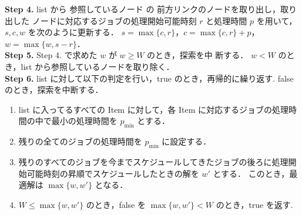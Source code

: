 \documentclass[12pt]{optlab-bachelor}
\begin{document}
  \textbf{Step 4.} list から 参照しているノード の 前方リンクのノードを取り出し，取り出した
  ノードに対応するジョブの処理開始可能時刻 $r$ と処理時間 $p$ を用いて，
  $s,c,w$ を次のように更新する．
  $s = \max\{c, r\}$，$c = \max\{c, r\} + p$，$w = \max\{w, s - r\}$．\\

  \textbf{Step 5.} Step 4. で求めた $w$ が $w \ge W$ のとき，探索を中
  断する．
  $w < W$ のとき，list から参照しているノードを取り除く．\\

  \textbf{Step 6.} list に対して以下の判定を行い，true のとき，再帰的に繰り返す. false のとき，探索を中断する．
  \begin{enumerate}
    \item list に入ってるすべての Item に対して，各 Item に対応するジョブの処理時間の中で最小の処理時間を $p_{\min}$ とする．
    \item 残りの全てのジョブの処理時間を $p_{\min}$ に設定する．
    \item 残りのすべてのジョブを今までスケジュールしてきたジョブの後ろに処理開始可能時刻の昇順でスケジュールしたときの解を $w'$ とする．
    このとき，最適解は $\max\{w, w'\}$ となる．
    \item $W \le \max\{w, w'\}$ のとき，false を $\max\{w, w'\} < W$ のとき，true を返す.
  \end{enumerate}
\end{document}
